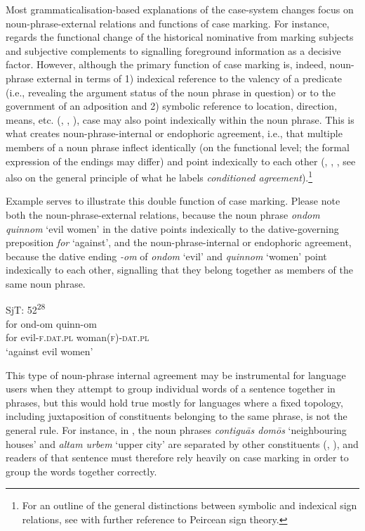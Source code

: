 \documentclass[output=paper]{langsci/langscibook}
\begin{document}
Most grammaticalisation-based explanations of the case-system changes focus on noun-phrase-external relations and functions of case marking. For instance, \citet{Jensen2011} regards the functional change of the historical nominative from marking subjects and subjective complements to signalling foreground information as a decisive factor. However, although the primary function of case marking is, indeed, noun-phrase external in terms of 1) indexical reference to the valency of a predicate (i.e., revealing the argument status of the noun phrase in question) or to the government of an adposition and 2) symbolic reference to location, direction, means, etc. (\citealt[1080–1086]{Blake2004}, \citealt[2]{AndersenConf}, \citealt[154–155]{Heltoft2019}), case may also point indexically within the noun phrase. This is what creates noun-phrase-internal or endophoric agreement, i.e., that multiple members of a noun phrase inflect identically (on the functional level; the formal expression of the endings may differ) and point indexically to each other (\citealt[2]{AndersenConf}, \citealt[52]{Haspelmath1996}, \citealt[82]{Nielsen2010}, see also \citet[86–89]{Nielsen2010} on the general principle of what he labels \textit{conditioned agreement}).\footnote{For an outline of the general distinctions between symbolic and indexical sign relations, see \textcites[4–5, 27–30]{Andersen1980}{Andersen2010}{AndersenConf} with further reference to Peircean sign theory.}

Example  serves to illustrate this double function of case marking. Please note both the noun-phrase-external relations, because the noun phrase \textit{ondom quinnom} ‘evil women’ in the dative points indexically to the dative-governing preposition \textit{for} ‘against’, and the noun-phrase-internal or endophoric agreement, because the dative ending \textit{{}-om} of \textit{ondom} ‘evil’ and \textit{quinnom} ‘women’ point indexically to each other, signalling that they belong together as members of the same noun phrase.


\ea \label{ex:hansen:21}
{SjT: 52\textsuperscript{28}}\\
\gll for ond-om quinn-om\\
     for evil-\textsc{f.dat.pl} woman\textsc{(f)-dat.pl}\\
\glt ‘against evil women’
\z

This type of noun-phrase internal agreement may be instrumental for language users when they attempt to group individual words of a sentence together in phrases, but this would hold true mostly for languages where a fixed topology, including juxtaposition of constituents belonging to the same phrase, is not the general rule. For instance, in , the noun phrases \textit{contiguās domōs} ‘neighbouring houses’ and \textit{altam urbem} ‘upper city’ are separated by other constituents (\citealt[2]{AndersenConf}, \citealt[89–93]{Nielsen2010}), and readers of that sentence must therefore rely heavily on case marking in order to group the words together correctly.
\end{document}
